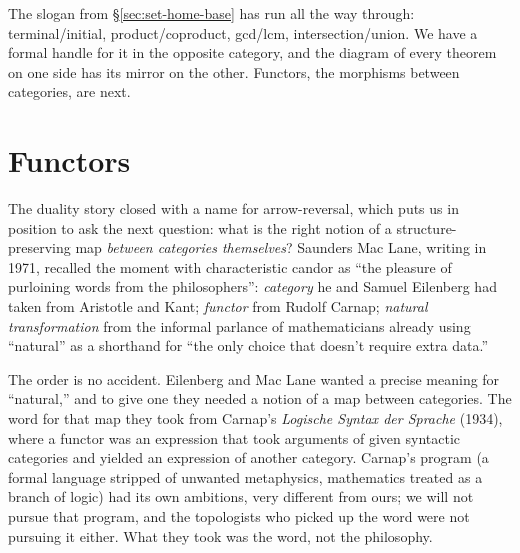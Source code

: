 \noindent The slogan from \S\ref{sec:set-home-base} has run all
the way through: terminal/initial, product/coproduct,
gcd/lcm, intersection/union. We have a formal handle for it in
the opposite category, and the diagram of every theorem on one
side has its mirror on the other. Functors, the morphisms
between categories, are next.

\section{Functors}\label{sec:functors}

\noindent The duality story closed with a name for arrow-reversal,
which puts us in position to ask the next question: what is the
right notion of a structure-preserving map \textit{between
categories themselves}? Saunders Mac Lane, writing in 1971,
recalled the moment with characteristic candor as ``the pleasure
of purloining words from the philosophers'': \textit{category} he
and Samuel Eilenberg had taken from Aristotle and Kant;
\textit{functor} from Rudolf Carnap; \textit{natural
transformation} from the informal parlance of mathematicians
already using ``natural'' as a shorthand for ``the only choice
that doesn't require extra data.''

\noindent The order is no accident. Eilenberg and Mac
Lane wanted a precise meaning for ``natural,'' and to give one
they needed a notion of a map between categories. The word for
that map they took from Carnap's \textit{Logische Syntax der
Sprache} (1934), where a functor was an expression that took
arguments of given syntactic categories and yielded an expression
of another category. Carnap's program (a
formal language stripped of unwanted metaphysics, mathematics
treated as a branch of logic) had its own ambitions, very
different from ours; we will not pursue that program, and the
topologists who picked up the word were not pursuing it either.
What they took was the word, not the philosophy.

